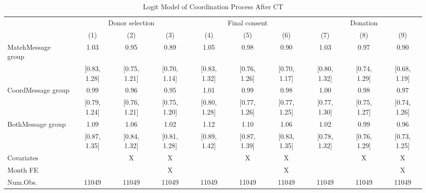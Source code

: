 \documentclass[12pt, a4paper]{article}
\begin{document}
\clearpage

\begin{landscape}\begin{table}[H]

\caption{\label{tab:logit-coordinate}Logit Model of Coordination Process After CT}
\centering
\fontsize{8}{10}\selectfont
\begin{threeparttable}
\begin{tabular}[t]{lccccccccc}
\toprule
\multicolumn{1}{c}{ } & \multicolumn{3}{c}{Donor selection} & \multicolumn{3}{c}{Final consent} & \multicolumn{3}{c}{Donation} \\
\cmidrule(l{3pt}r{3pt}){2-4} \cmidrule(l{3pt}r{3pt}){5-7} \cmidrule(l{3pt}r{3pt}){8-10}
  & (1) & (2) & (3) & (4) & (5) & (6) & (7) & (8) & (9)\\
\midrule
MatchMessage group & \num{1.03} & \num{0.95} & \num{0.89} & \num{1.05} & \num{0.98} & \num{0.90} & \num{1.03} & \num{0.97} & \num{0.90}\\
 & {}[\num{0.83}, \num{1.28}] & {}[\num{0.75}, \num{1.21}] & {}[\num{0.70}, \num{1.14}] & {}[\num{0.83}, \num{1.32}] & {}[\num{0.76}, \num{1.26}] & {}[\num{0.70}, \num{1.17}] & {}[\num{0.80}, \num{1.32}] & {}[\num{0.74}, \num{1.29}] & {}[\num{0.68}, \num{1.19}]\\
CoordMessage group & \num{0.99} & \num{0.96} & \num{0.95} & \num{1.01} & \num{0.99} & \num{0.98} & \num{1.00} & \num{0.98} & \num{0.97}\\
 & {}[\num{0.79}, \num{1.24}] & {}[\num{0.76}, \num{1.21}] & {}[\num{0.75}, \num{1.20}] & {}[\num{0.80}, \num{1.28}] & {}[\num{0.77}, \num{1.26}] & {}[\num{0.77}, \num{1.25}] & {}[\num{0.77}, \num{1.30}] & {}[\num{0.75}, \num{1.27}] & {}[\num{0.74}, \num{1.26}]\\
BothMessage group & \num{1.09} & \num{1.06} & \num{1.02} & \num{1.12} & \num{1.10} & \num{1.06} & \num{1.02} & \num{0.99} & \num{0.96}\\
 & {}[\num{0.87}, \num{1.35}] & {}[\num{0.84}, \num{1.32}] & {}[\num{0.81}, \num{1.28}] & {}[\num{0.89}, \num{1.42}] & {}[\num{0.87}, \num{1.39}] & {}[\num{0.83}, \num{1.35}] & {}[\num{0.78}, \num{1.32}] & {}[\num{0.76}, \num{1.29}] & {}[\num{0.73}, \num{1.25}]\\
\midrule
Covariates &  & X & X &  & X & X &  & X & X\\
Month FE &  &  & X &  &  & X &  &  & X\\
Num.Obs. & \num{11049} & \num{11049} & \num{11049} & \num{11049} & \num{11049} & \num{11049} & \num{11049} & \num{11049} & \num{11049}\\

\end{tabular}
\end{threeparttable}
\end{table}
\end{landscape}
\end{document}
